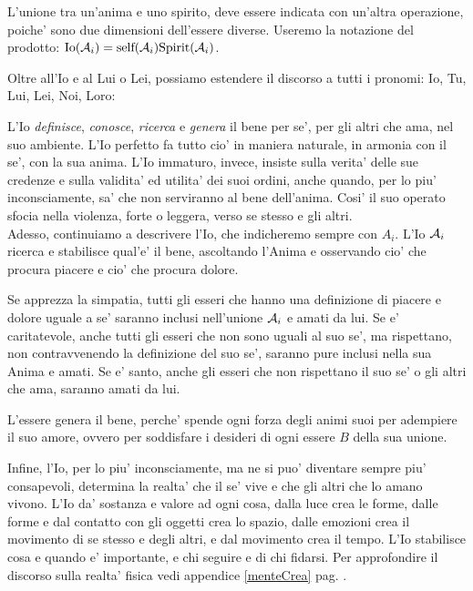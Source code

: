 L'unione tra un'anima e uno spirito, deve essere indicata con un'altra operazione, poiche' sono due dimensioni dell'essere diverse. Useremo la notazione del prodotto: $\textrm{Io}(\mathcal{A}_i) = \textrm{self}(\mathcal{A}_i)  \textrm{Spirit}(\mathcal{A}_i)$.

Oltre all'Io e al Lui o Lei, possiamo estendere il discorso a tutti i pronomi: Io, Tu, Lui, Lei, Noi, Loro:

    L'Io \emph{definisce}, \emph{conosce}, \emph{ricerca} e \emph{genera} il bene per se', per gli altri che ama, nel suo ambiente. L'Io perfetto fa tutto cio' in maniera naturale, in armonia con il se', con la sua anima. L'Io immaturo, invece, insiste sulla verita' delle sue credenze e sulla validita' ed utilita' dei suoi ordini, anche quando, per lo piu' inconsciamente, sa' che non serviranno al bene dell'anima. Cosi' il suo operato sfocia nella violenza, forte o leggera, verso se stesso e gli altri.\\

Adesso, continuiamo a descrivere l'Io, che indicheremo sempre con $A_i$. L'Io $\mathcal{A}_i$ ricerca e stabilisce qual'e' il bene, ascoltando l'Anima e osservando cio' che procura piacere e cio' che procura dolore. 

    Se apprezza la simpatia, tutti gli esseri che hanno una definizione di piacere e dolore uguale a se' saranno inclusi nell'unione $\mathcal{A}_i$ e amati da lui. Se e' caritatevole, anche tutti gli esseri che non sono uguali al suo se', ma rispettano, non contravvenendo la definizione del suo se', saranno pure inclusi nella sua Anima e amati. Se e' santo, anche gli esseri che non rispettano il suo se' o gli altri che ama, saranno amati da lui.

    L'essere genera il bene, perche' spende ogni forza degli animi suoi per adempiere il suo amore, ovvero per soddisfare i desideri di ogni essere $B$ della sua unione.

    Infine, l'Io, per lo piu' inconsciamente, ma ne si puo' diventare sempre piu' consapevoli, determina la realta' che il se' vive e che gli altri che lo amano vivono. L'Io da' sostanza e valore ad ogni cosa, dalla luce crea le forme, dalle forme e dal contatto con gli oggetti crea lo spazio, dalle emozioni crea il movimento di se stesso e degli altri, e dal movimento crea il tempo. L'Io stabilisce cosa e quando e' importante, e chi seguire e di chi fidarsi. Per approfondire il discorso sulla realta' fisica vedi appendice \ref{menteCrea} pag. \pageref{menteCrea}.

